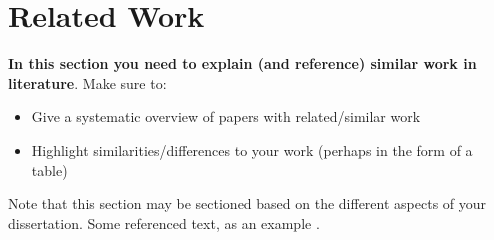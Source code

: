 \section{Related Work}
\textbf{In this section you need to explain (and reference) similar work in literature}.  Make sure to:

\begin{itemize}
 \item Give a systematic overview of papers with related/similar work
 \item Highlight similarities/differences to your work (perhaps in the form of a table)
\end{itemize}

Note that this section may be sectioned based on the different aspects of your dissertation.  Some referenced text, as an example \citep{Arrighi2003, WithersMartinez2012, Ebejer2016}.

